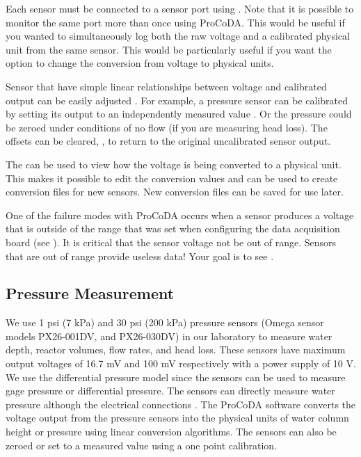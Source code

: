 \documentclass[letterpaper,10pt,english]{sphinxmanual}
\begin{document}
Each sensor must be connected to a sensor port  using
. Note that it is possible to monitor the same port more than once using ProCoDA. This would be useful if you wanted to simultaneously log both the raw voltage and a calibrated physical unit from the same sensor. This would be particularly useful if you want the option to change the conversion from voltage to physical units.

Sensor that have simple linear relationships between voltage and calibrated output can be easily adjusted . For example, a pressure sensor can be calibrated by setting its output to an independently measured value . Or the pressure could be zeroed  under conditions of no flow (if you are measuring head loss). The offsets can be cleared, , to return to the original uncalibrated sensor output.

The  can be used to view how the voltage is being converted to a physical unit. This makes it possible to edit the conversion values and can be used to create conversion files for new sensors. New conversion files can be saved  for use later.

One of the failure modes with ProCoDA occurs when a sensor produces a voltage that is outside of the range  that was set when configuring the data acquisition board (see {\hyperref[\detokenize{ProCoDA/ProCoDA:heading-procoda-configure}]{}}). It is critical that the sensor voltage not be out of range. Sensors that are out of range provide useless data! Your goal is to see .


\subsection{Pressure Measurement}
\label{\detokenize{ProCoDA/ProCoDA:pressure-measurement}}\label{\detokenize{ProCoDA/ProCoDA:heading-procoda-pressure-measurement}}
We use 1 psi (7 kPa) and 30 psi (200 kPa) pressure sensors (Omega sensor models PX26-001DV, and PX26-030DV) in our laboratory to measure water depth, reactor volumes, flow rates, and head loss. These sensors have maximum output voltages of 16.7 mV and 100 mV respectively with a power supply of 10 V. We use the differential pressure model since the sensors can be used to measure gage pressure or differential pressure. The sensors can directly measure water pressure although the electrical connections .
The ProCoDA software converts the voltage output from the pressure sensors into the physical units of water column height or pressure using linear conversion algorithms. The sensors can also be zeroed or set to a measured value using a one point calibration.
\end{document}

